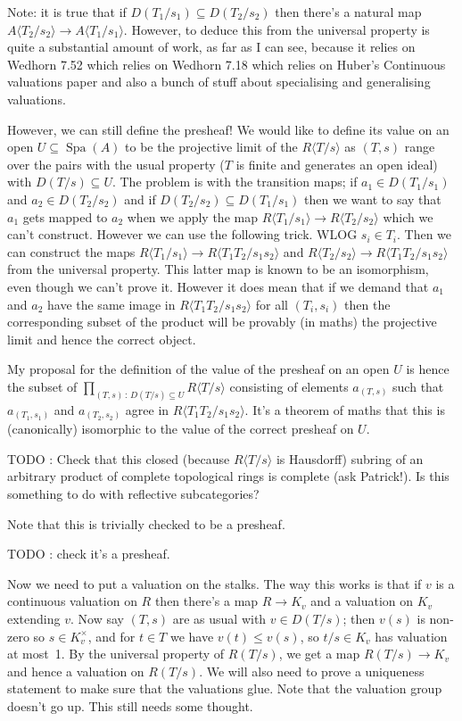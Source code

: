 \documentclass{amsart}
\DeclareMathOperator{\Spa}{Spa}
\theoremstyle{plain}
\theoremstyle{remark}
\begin{document}
Note: it is true that if $D(T_1/s_1)\subseteq D(T_2/s_2)$ then there's a natural map $A\langle T_2/s_2\rangle \to A\langle T_1/s_1\rangle$. However, to deduce this from the universal property is quite a substantial amount of work, as far as I can see, because it relies on Wedhorn 7.52 which relies on Wedhorn 7.18 which relies on Huber's Continuous valuations paper and also a bunch of stuff about specialising and generalising valuations.

However, we can still define the presheaf! We would like to define its value on an open $U\subseteq\Spa(A)$ to be the projective limit of the $R\langle T/s\rangle$ as $(T,s)$ range over the pairs with the usual property ($T$ is finite and generates an open ideal) with $D(T/s)\subseteq U$. The problem is with the transition maps; if $a_1\in D(T_1/s_1)$ and $a_2\in D(T_2/s_2)$ and if $D(T_2/s_2)\subseteq D(T_1/s_1)$ then we want to say that $a_1$ gets mapped to $a_2$ when we apply the map $R\langle T_1/s_1\rangle\to R\langle T_2/s_2\rangle$ which we can't construct. However we can use the following trick. WLOG $s_i\in T_i$. Then we can construct the maps $R\langle T_1/s_1\rangle\to R\langle T_1T_2/s_1s_2\rangle$ and $R\langle T_2/s_2\rangle\to R\langle T_1T_2/s_1s_2\rangle$ from the universal property. This latter map is known to be an isomorphism, even though we can't prove it. However it does mean that if we demand that $a_1$ and $a_2$ have the same image in $R\langle T_1T_2/s_1s_2\rangle$ for all $(T_i,s_i)$ then the corresponding subset of the product will be provably (in maths) the projective limit and hence the correct object.

My proposal for the definition of the value of the presheaf on an open $U$ is hence the subset of $\prod_{(T,s)\,:\,D(T/s)\subseteq U}R\langle T/s\rangle$ consisting of elements $a_{(T,s)}$ such that $a_{(T_1,s_1)}$ and $a_{(T_2,s_2)}$ agree in $R\langle T_1T_2/s_1s_2\rangle$. It's a theorem of maths that this is (canonically) isomorphic to the value of the correct presheaf on $U$.

TODO : Check that this closed (because $R\langle T/s\rangle$ is Hausdorff) subring of an arbitrary product of complete topological rings is complete (ask Patrick!). Is this something to do with reflective subcategories?

Note that this is trivially checked to be a presheaf.

TODO : check it's a presheaf.

Now we need to put a valuation on the stalks. The way this works is that if $v$ is a continuous valuation on $R$ then there's a map $R\to K_v$ and a valuation on $K_v$ extending $v$. Now say $(T,s)$ are as usual with $v\in D(T/s)$; then $v(s)$ is non-zero so $s\in K_v^\times$, and for $t\in T$ we have $v(t)\leq v(s)$, so $t/s\in K_v$ has valuation at most~1. By the universal property of $R(T/s)$, we get a map $R(T/s)\to K_v$ and hence a valuation on $R(T/s)$. We will also need to prove a uniqueness statement to make sure that the valuations glue. Note that the valuation group doesn't go up. This still needs some thought.
\end{document}
